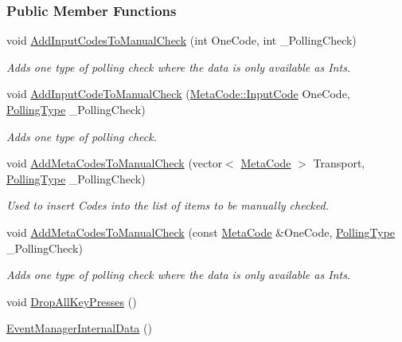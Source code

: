 \subsubsection*{Public Member Functions}
\begin{DoxyCompactItemize}
\item 
void \hyperlink{structphys_1_1internal_1_1EventManagerInternalData_a3f562c06139a3712bdb5ff843b3973bc}{AddInputCodesToManualCheck} (int OneCode, int \_\-PollingCheck)
\begin{DoxyCompactList}\small\item\em Adds one type of polling check where the data is only available as Ints. \item\end{DoxyCompactList}\item 
void \hyperlink{structphys_1_1internal_1_1EventManagerInternalData_abf8c7b472e4b19a0c0243dcaf49a38ae}{AddInputCodeToManualCheck} (\hyperlink{classphys_1_1MetaCode_a3e501cbb5bf0f6f1fdb7211465bda8d8}{MetaCode::InputCode} OneCode, \hyperlink{structphys_1_1internal_1_1EventManagerInternalData_ab9ab8380b84448aacf46a63050e159af}{PollingType} \_\-PollingCheck)
\begin{DoxyCompactList}\small\item\em Adds one type of polling check. \item\end{DoxyCompactList}\item 
void \hyperlink{structphys_1_1internal_1_1EventManagerInternalData_ac2e4044e2fc6eb2df18a3e274c175065}{AddMetaCodesToManualCheck} (vector$<$ \hyperlink{classphys_1_1MetaCode}{MetaCode} $>$ Transport, \hyperlink{structphys_1_1internal_1_1EventManagerInternalData_ab9ab8380b84448aacf46a63050e159af}{PollingType} \_\-PollingCheck)
\begin{DoxyCompactList}\small\item\em Used to insert Codes into the list of items to be manually checked. \item\end{DoxyCompactList}\item 
void \hyperlink{structphys_1_1internal_1_1EventManagerInternalData_a792d2c7bb8fe9e169e01650ca92f939e}{AddMetaCodesToManualCheck} (const \hyperlink{classphys_1_1MetaCode}{MetaCode} \&OneCode, \hyperlink{structphys_1_1internal_1_1EventManagerInternalData_ab9ab8380b84448aacf46a63050e159af}{PollingType} \_\-PollingCheck)
\begin{DoxyCompactList}\small\item\em Adds one type of polling check where the data is only available as Ints. \item\end{DoxyCompactList}\item 
void \hyperlink{structphys_1_1internal_1_1EventManagerInternalData_ab1f4a0b147beb750deb77e000daa27cc}{DropAllKeyPresses} ()
\item 
\hypertarget{structphys_1_1internal_1_1EventManagerInternalData_a2bc6e8af4992cc8b4935f4e5b32b32a0}{
\hyperlink{structphys_1_1internal_1_1EventManagerInternalData_a2bc6e8af4992cc8b4935f4e5b32b32a0}{EventManagerInternalData} ()}
\label{structphys_1_1internal_1_1EventManagerInternalData_a2bc6e8af4992cc8b4935f4e5b32b32a0}


\end{DoxyCompactItemize}

